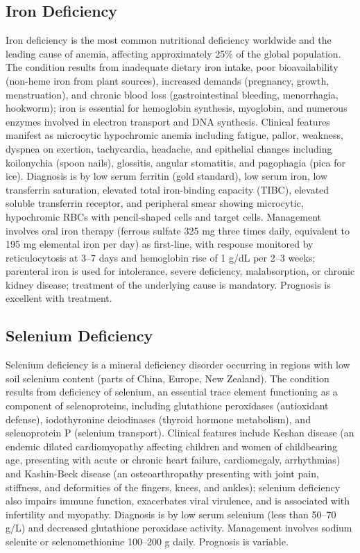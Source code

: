 \subsection{Iron Deficiency}
\label{sec:Iron Deficiency}
Iron deficiency is the most common nutritional deficiency worldwide and the leading cause of anemia, affecting approximately 25\% of the global population. The condition results from inadequate dietary iron intake, poor bioavailability (non-heme iron from plant sources), increased demands (pregnancy, growth, menstruation), and chronic blood loss (gastrointestinal bleeding, menorrhagia, hookworm); iron is essential for hemoglobin synthesis, myoglobin, and numerous enzymes involved in electron transport and DNA synthesis. Clinical features manifest as microcytic hypochromic anemia including fatigue, pallor, weakness, dyspnea on exertion, tachycardia, headache, and epithelial changes including koilonychia (spoon nails), glossitis, angular stomatitis, and pagophagia (pica for ice). Diagnosis is by low serum ferritin (gold standard), low serum iron, low transferrin saturation, elevated total iron-binding capacity (TIBC), elevated soluble transferrin receptor, and peripheral smear showing microcytic, hypochromic RBCs with pencil-shaped cells and target cells. Management involves oral iron therapy (ferrous sulfate 325 mg three times daily, equivalent to 195 mg elemental iron per day) as first-line, with response monitored by reticulocytosis at 3--7 days and hemoglobin rise of 1 g/dL per 2--3 weeks; parenteral iron is used for intolerance, severe deficiency, malabsorption, or chronic kidney disease; treatment of the underlying cause is mandatory. Prognosis is excellent with treatment.

\subsection{Selenium Deficiency}
\label{sec:Selenium Deficiency}
Selenium deficiency is a mineral deficiency disorder occurring in regions with low soil selenium content (parts of China, Europe, New Zealand). The condition results from deficiency of selenium, an essential trace element functioning as a component of selenoproteins, including glutathione peroxidases (antioxidant defense), iodothyronine deiodinases (thyroid hormone metabolism), and selenoprotein P (selenium transport). Clinical features include Keshan disease (an endemic dilated cardiomyopathy affecting children and women of childbearing age, presenting with acute or chronic heart failure, cardiomegaly, arrhythmias) and Kashin-Beck disease (an osteoarthropathy presenting with joint pain, stiffness, and deformities of the fingers, knees, and ankles); selenium deficiency also impairs immune function, exacerbates viral virulence, and is associated with infertility and myopathy. Diagnosis is by low serum selenium (less than 50--70 \textmu g/L) and decreased glutathione peroxidase activity. Management involves sodium selenite or selenomethionine 100--200 \textmu g daily. Prognosis is variable.

